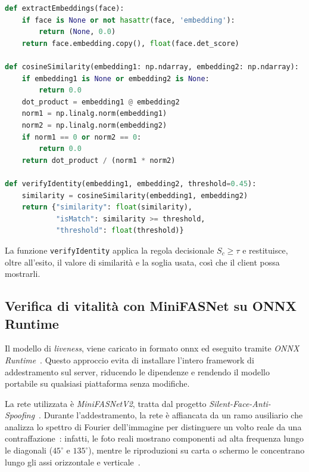 \begin{lstlisting}[float=htbp, language=Python, caption={Estrazione dell'embedding e verifica tramite similarit\`a coseno (\texttt{core/face\_recognizer.py})}, label={lst:verifyIdentity}]
def extractEmbeddings(face):
    if face is None or not hasattr(face, 'embedding'):
        return (None, 0.0)
    return face.embedding.copy(), float(face.det_score)

def cosineSimilarity(embedding1: np.ndarray, embedding2: np.ndarray):
    if embedding1 is None or embedding2 is None:
        return 0.0
    dot_product = embedding1 @ embedding2
    norm1 = np.linalg.norm(embedding1)
    norm2 = np.linalg.norm(embedding2)
    if norm1 == 0 or norm2 == 0:
        return 0.0
    return dot_product / (norm1 * norm2)

def verifyIdentity(embedding1, embedding2, threshold=0.45):
    similarity = cosineSimilarity(embedding1, embedding2)
    return {"similarity": float(similarity),
            "isMatch": similarity >= threshold,
            "threshold": float(threshold)}
\end{lstlisting}

La funzione \texttt{verifyIdentity} applica la regola decisionale $S_c \ge \tau$ e restituisce, oltre all'esito, il valore di similarità e la soglia usata, così che il client possa mostrarli.

\subsection{Verifica di vitalità con MiniFASNet su ONNX Runtime}\label{cap:3.2.3-livenessOnnx}
Il modello di \textit{liveness}, viene caricato in formato \gls{onnx} ed eseguito tramite \textit{ONNX Runtime}~\cite{ONNXRuntime}. 
Questo approccio evita di installare l'intero framework di addestramento sul server, riducendo le dipendenze e rendendo il modello portabile su qualsiasi piattaforma senza modifiche.

La rete utilizzata è \textit{MiniFASNetV2}, tratta dal progetto \textit{Silent-Face-Anti-Spoofing}~\cite{MinivisionaiSilentFaceAntiSpoofing}. 
Durante l'addestramento, la rete è affiancata da un ramo ausiliario che analizza lo spettro di Fourier dell'immagine per distinguere un volto reale da una contraffazione~\cite{MinivisionaiSilentFaceAntiSpoofing}: infatti, le foto reali mostrano componenti ad alta frequenza lungo le diagonali ($45^\circ$ e $135^\circ$), mentre le riproduzioni su carta o schermo le concentrano lungo gli assi orizzontale e verticale~\cite{liSilentFaceAntiSpoofing2024}.

